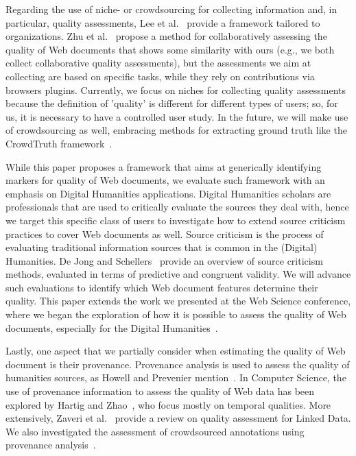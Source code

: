 \documentclass{llncs}
\begin{document}
Regarding the use of niche- or crowdsourcing for collecting information and, in particular, quality assessments, Lee et al.~\cite{Lee:2002:AMI:637474.637478} provide a framework tailored to organizations. Zhu et al.~\cite{zhu} propose a method for collaboratively assessing the quality of Web documents that shows some similarity with ours (e.g., we both collect collaborative quality assessments), but the assessments we aim at collecting are based on specific tasks, while they rely on contributions via browsers plugins. Currently, we focus on niches for collecting quality assessments because the definition of 'quality' is different for different types of users; so, for us, it is necessary to have a controlled user study. In the future, we will make use of crowdsourcing as well, embracing methods for extracting ground truth like the CrowdTruth framework~\cite{Inel2014}.
%
%
%
%
%


While this paper proposes a framework that aims at generically identifying markers for quality of Web documents, we evaluate such framework with an emphasis on Digital Humanities applications. Digital Humanities scholars are professionals that are used to critically evaluate the sources they deal with, hence we target this specific class of users to investigate how to extend source criticism practices to cover Web documents as well.
Source criticism is the process of evaluating traditional information sources that is common in the (Digital) Humanities. De Jong and Schellers~\cite{dejong} provide an overview of source criticism methods, evaluated in terms of predictive and congruent validity. We will advance such evaluations to identify which Web document features determine their quality.
This paper extends the work we presented at the Web Science conference, where we began the exploration of how it is possible to assess the quality of Web documents, especially for the Digital Humanities~\cite{Ceolin:2016:TWD:2908131.2908198}.

Lastly, one aspect that we partially consider when estimating the quality of Web document is their provenance. Provenance analysis is used to assess the quality of humanities sources, as Howell and Prevenier mention~\cite{provenance}. In Computer Science,
the use of provenance information to assess the quality of Web data has been explored by Hartig and Zhao~\cite{hartig}, who focus mostly on temporal qualities. More extensively, Zaveri et al.~\cite{LDQ} provide a review on quality assessment for Linked Data. We also investigated the assessment of crowdsourced annotations using provenance analysis~\cite{jdiq2015,ifiptm2015}. 
\end{document}

